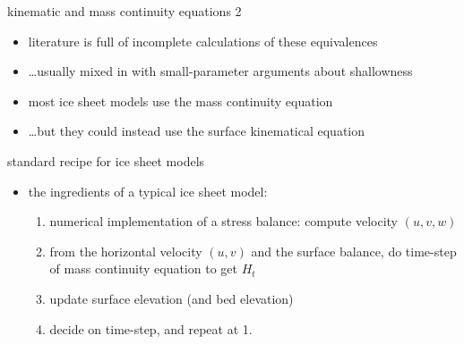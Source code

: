 \begin{frame}{kinematic and mass continuity equations 2}

\begin{itemize}
\item literature is full of incomplete calculations of these equivalences
\item \dots usually mixed in with small-parameter arguments about shallowness
\item most ice sheet models use the mass continuity equation
\item \dots but they could instead use the surface kinematical equation
\end{itemize}
\end{frame}


\begin{frame}{standard recipe for ice sheet models}

\begin{itemize}
\item the ingredients of a typical ice sheet model:
  \begin{enumerate}
  \item numerical implementation of a stress balance: compute velocity $(u,v,w)$
  \item from the horizontal velocity $(u,v)$ and the surface balance, do time-step of mass continuity equation to get $H_t$
  \item update surface elevation (and bed elevation)
  \item decide on time-step, and repeat at 1.
  \end{enumerate}
\end{itemize}
\end{frame}
